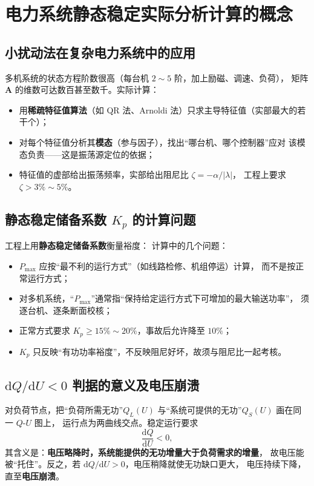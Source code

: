 \section{电力系统静态稳定实际分析计算的概念}

\subsection{小扰动法在复杂电力系统中的应用}

多机系统的状态方程阶数很高（每台机 $2\sim5$ 阶，加上励磁、调速、负荷），
矩阵 $\boldsymbol A$ 的维数可达数百甚至数千。实际计算：
\begin{itemize}
  \item 用\textbf{稀疏特征值算法}（如 QR 法、Arnoldi 法）只求主导特征值（实部最大的若干个）；
  \item 对每个特征值分析其\textbf{模态}（参与因子），找出“哪台机、哪个控制器”应对
        该模态负责——这是振荡源定位的依据；
  \item 特征值的虚部给出振荡频率，实部给出阻尼比 $\zeta=-\alpha/\left|\lambda\right|$，
        工程上要求 $\zeta>3\%\sim5\%$。
\end{itemize}

\subsection{静态稳定储备系数 $K_p$ 的计算问题}

工程上用\textbf{静态稳定储备系数}衡量裕度：
计算中的几个问题：
\begin{itemize}
  \item $P_{\max}$ 应按“最不利的运行方式”（如线路检修、机组停运）计算，
        而不是按正常运行方式；
  \item 对多机系统，“$P_{\max}$”通常指“保持给定运行方式下可增加的最大输送功率”，
        须逐台机、逐条断面校核；
  \item 正常方式要求 $K_p\ge15\%\sim20\%$，事故后允许降至 $10\%$；
  \item $K_p$ 只反映“有功功率裕度”，不反映阻尼好坏，故须与阻尼比一起考核。
\end{itemize}

\subsection{$\mathrm{d}Q/\mathrm{d}U<0$ 判据的意义及电压崩溃}

对负荷节点，把“负荷所需无功”$Q_L(U)$ 与“系统可提供的无功”$Q_S(U)$ 画在同一 $Q$-$U$ 图上，
运行点为两曲线交点。稳定运行要求
\begin{equation}
  \frac{\mathrm{d}Q}{\mathrm{d}U}<0 ,
\end{equation}
其含义是：\textbf{电压略降时，系统能提供的无功增量大于负荷需求的增量}，
故电压能被“托住”。反之，若 $\mathrm{d}Q/\mathrm{d}U>0$，电压稍降就使无功缺口更大，
电压持续下降，直至\textbf{电压崩溃}。


